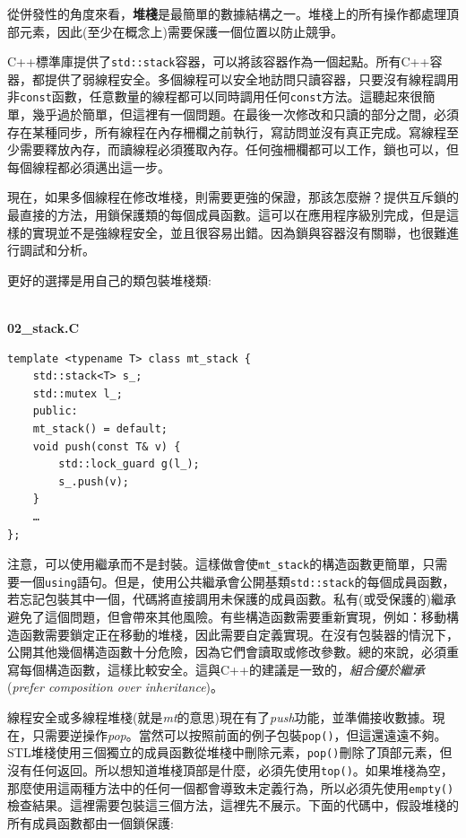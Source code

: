 
從併發性的角度來看，\textbf{堆棧}是最簡單的數據結構之一。堆棧上的所有操作都處理頂部元素，因此(至少在概念上)需要保護一個位置以防止競爭。

C++標準庫提供了\texttt{std::stack}容器，可以將該容器作為一個起點。所有C++容器，都提供了弱線程安全。多個線程可以安全地訪問只讀容器，只要沒有線程調用非\texttt{const}函數，任意數量的線程都可以同時調用任何\texttt{const}方法。這聽起來很簡單，幾乎過於簡單，但這裡有一個問題。在最後一次修改和只讀的部分之間，必須存在某種同步，所有線程在內存柵欄之前執行，寫訪問並沒有真正完成。寫線程至少需要釋放內存，而讀線程必須獲取內存。任何強柵欄都可以工作，鎖也可以，但每個線程都必須邁出這一步。


現在，如果多個線程在修改堆棧，則需要更強的保證，那該怎麼辦？提供互斥鎖的最直接的方法，用鎖保護類的每個成員函數。這可以在應用程序級別完成，但是這樣的實現並不是強線程安全，並且很容易出錯。因為鎖與容器沒有關聯，也很難進行調試和分析。

更好的選擇是用自己的類包裝堆棧類:

\hspace*{\fill} \\ %
\noindent
\textbf{02\_stack.C}
\begin{lstlisting}[style=styleCXX]
template <typename T> class mt_stack {
	std::stack<T> s_;
	std::mutex l_;
	public:
	mt_stack() = default;
	void push(const T& v) {
		std::lock_guard g(l_);
		s_.push(v);
	}
	…
};
\end{lstlisting}

注意，可以使用繼承而不是封裝。這樣做會使\texttt{mt\_stack}的構造函數更簡單，只需要一個\texttt{using}語句。但是，使用公共繼承會公開基類\texttt{std::stack}的每個成員函數，若忘記包裝其中一個，代碼將直接調用未保護的成員函數。私有(或受保護的)繼承避免了這個問題，但會帶來其他風險。有些構造函數需要重新實現，例如：移動構造函數需要鎖定正在移動的堆棧，因此需要自定義實現。在沒有包裝器的情況下，公開其他幾個構造函數十分危險，因為它們會讀取或修改參數。總的來說，必須重寫每個構造函數，這樣比較安全。這與C++的建議是一致的，\textit{組合優於繼承}(\textit{prefer composition over inheritance})。

線程安全或多線程堆棧(就是\textit{mt}的意思)現在有了\textit{push}功能，並準備接收數據。現在，只需要逆操作\textit{pop}。當然可以按照前面的例子包裝\texttt{pop()}，但這還遠遠不夠。STL堆棧使用三個獨立的成員函數從堆棧中刪除元素，\texttt{pop()}刪除了頂部元素，但沒有任何返回。所以想知道堆棧頂部是什麼，必須先使用\texttt{top()}。如果堆棧為空，那麼使用這兩種方法中的任何一個都會導致未定義行為，所以必須先使用\texttt{empty()}檢查結果。這裡需要包裝這三個方法，這裡先不展示。下面的代碼中，假設堆棧的所有成員函數都由一個鎖保護:

